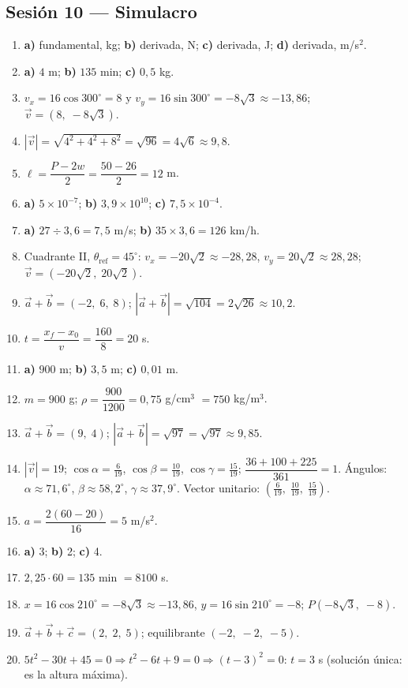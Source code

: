 \documentclass[12pt, letterpaper]{article}
\providecommand{\sen}{\sin}
\begin{document}
\subsection*{Sesión 10 — Simulacro}
\begin{enumerate}[leftmargin=*, label=\textbf{\arabic*.}]
  \item \textbf{a)} fundamental, kg; \textbf{b)} derivada, N; \textbf{c)} derivada, J; \textbf{d)} derivada, m/s$^2$.
  \item \textbf{a)} $4$ m; \textbf{b)} $135$ min; \textbf{c)} $0{,}5$ kg.
  \item $v_x=16\cos 300^{\circ}=8$ y $v_y=16\sen 300^{\circ}=-8\sqrt{3}\approx -13{,}86$; $\vec v=(8,\; -8\sqrt{3})$.
  \item $|\vec v|=\sqrt{4^2+4^2+8^2}=\sqrt{96}=4\sqrt{6}\approx 9{,}8$.
  \item $\ell=\dfrac{P-2w}{2}=\dfrac{50-26}{2}=12$ m.
  \item \textbf{a)} $5 \times 10^{-7}$; \textbf{b)} $3{,}9 \times 10^{10}$; \textbf{c)} $7{,}5 \times 10^{-4}$.
  \item \textbf{a)} $27 \div 3{,}6 = 7{,}5$ m/s; \quad \textbf{b)} $35 \times 3{,}6 = 126$ km/h.
  \item Cuadrante II, $\theta_{\text{ref}}=45^{\circ}$: $v_x=-20\sqrt{2}\approx -28{,}28$, $v_y=20\sqrt{2}\approx 28{,}28$; $\vec v=(-20\sqrt{2},\; 20\sqrt{2})$.
  \item $\vec a+\vec b=(-2,\; 6,\; 8)$; $|\vec a+\vec b|=\sqrt{104}=2\sqrt{26}\approx 10{,}2$.
  \item $t=\dfrac{x_f-x_0}{v}=\dfrac{160}{8}=20$ s.
  \item \textbf{a)} $900$ m; \textbf{b)} $3{,}5$ m; \textbf{c)} $0{,}01$ m.
  \item $m=900$ g; $\rho=\dfrac{900}{1200}=0{,}75$ g/cm$^3$ $=750$ kg/m$^3$.
  \item $\vec a+\vec b=(9,\; 4)$; $|\vec a+\vec b|=\sqrt{97}=\sqrt{97}\approx 9{,}85$.
  \item $|\vec v|=19$; $\cos\alpha=\frac{6}{19}$, $\cos\beta=\frac{10}{19}$, $\cos\gamma=\frac{15}{19}$; $\dfrac{36+100+225}{361}=1$. \checkmark\quad Ángulos: $\alpha\approx 71{,}6^{\circ}$, $\beta\approx 58{,}2^{\circ}$, $\gamma\approx 37{,}9^{\circ}$. Vector unitario: $(\frac{6}{19},\; \frac{10}{19},\; \frac{15}{19})$.
  \item $a=\dfrac{2(60-20)}{16}=5$ m/s$^2$.
  \item \textbf{a)} 3; \quad \textbf{b)} 2; \quad \textbf{c)} 4.
  \item $2{,}25\cdot 60=135$ min $=8100$ s.
  \item $x=16\cos 210^{\circ}=-8\sqrt{3}\approx -13{,}86$, $y=16\sen 210^{\circ}=-8$; $P(-8\sqrt{3},\; -8)$.
  \item $\vec a+\vec b+\vec c=(2,\; 2,\; 5)$; equilibrante $(-2,\; -2,\; -5)$.
  \item $5t^2-30t+45=0\Rightarrow t^2-6t+9=0\Rightarrow(t-3)^2=0$: $t=3$ s (solución única: es la altura máxima).
\end{enumerate}
\end{document}
